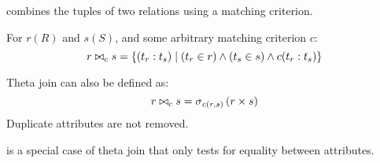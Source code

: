 \begin{multicols}{2}

    \begin{CheatsheetEntryFrame}


        \textit{} combines the tuples of two relations using a matching criterion.

        For $r(R)$ and $s(S)$, and some arbitrary matching criterion $c$:
        \begin{equation*}
            r \bowtie_c s = \setdef{(t_r : t_s)}{(t_r \in r) \wedge (t_s \in s) \wedge c(t_r : t_s)}
        \end{equation*}

        Theta join can also be defined as:
        \begin{equation*}
            r \bowtie_c s = \relselect_{c(r, s)}{\parens*{r \times s}}
        \end{equation*}
        Duplicate attributes are not removed.

        \vspace{\TextExtraSkip}%
        \textit{} is a special case of theta join that only tests for equality between attributes.


\end{CheatsheetEntryFrame}
\end{multicols}
